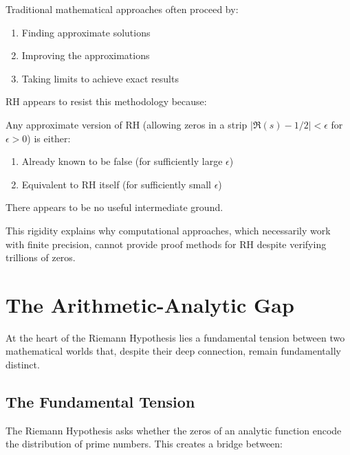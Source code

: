 Traditional mathematical approaches often proceed by:
\begin{enumerate}
\item Finding approximate solutions
\item Improving the approximations
\item Taking limits to achieve exact results
\end{enumerate}

RH appears to resist this methodology because:

\begin{theorem}
Any approximate version of RH (allowing zeros in a strip $|\Re(s) - 1/2| < \epsilon$ for $\epsilon > 0$) is either:
\begin{enumerate}
\item Already known to be false (for sufficiently large $\epsilon$)
\item Equivalent to RH itself (for sufficiently small $\epsilon$)
\end{enumerate}
There appears to be no useful intermediate ground.
\end{theorem}

This rigidity explains why computational approaches, which necessarily work with finite precision, cannot provide proof methods for RH despite verifying trillions of zeros.

\section{The Arithmetic-Analytic Gap}
\label{sec:arithmetic_analytic_gap}

At the heart of the Riemann Hypothesis lies a fundamental tension between two mathematical worlds that, despite their deep connection, remain fundamentally distinct.

\subsection{The Fundamental Tension}
\label{subsec:fundamental_tension}

The Riemann Hypothesis asks whether the zeros of an analytic function encode the distribution of prime numbers. This creates a bridge between:

